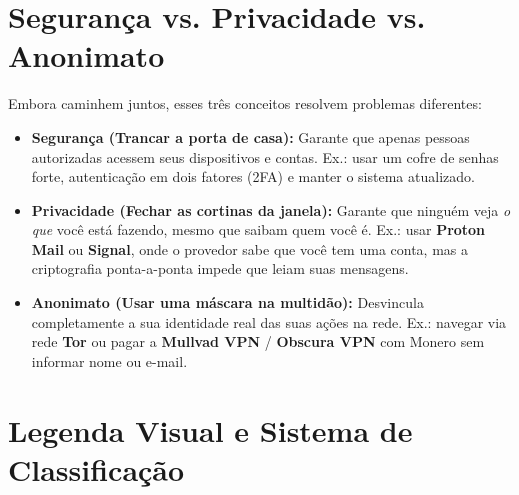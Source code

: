 \documentclass{pousadaguide}
\begin{document}
\section{Segurança vs. Privacidade vs. Anonimato}

Embora caminhem juntos, esses três conceitos resolvem problemas diferentes:

\begin{itemize}
  \item \textbf{Segurança (Trancar a porta de casa):} Garante que apenas pessoas autorizadas acessem seus dispositivos e contas. Ex.: usar um cofre de senhas forte, autenticação em dois fatores (2FA) e manter o sistema atualizado.
  \item \textbf{Privacidade (Fechar as cortinas da janela):} Garante que ninguém veja \emph{o que} você está fazendo, mesmo que saibam quem você é. Ex.: usar \textbf{Proton Mail} ou \textbf{Signal}, onde o provedor sabe que você tem uma conta, mas a criptografia ponta-a-ponta impede que leiam suas mensagens.
  \item \textbf{Anonimato (Usar uma máscara na multidão):} Desvincula completamente a sua identidade real das suas ações na rede. Ex.: navegar via rede \textbf{Tor} ou pagar a \textbf{Mullvad VPN} / \textbf{Obscura VPN} com Monero sem informar nome ou e-mail.
\end{itemize}

\section{Legenda Visual e Sistema de Classificação}
\end{document}
